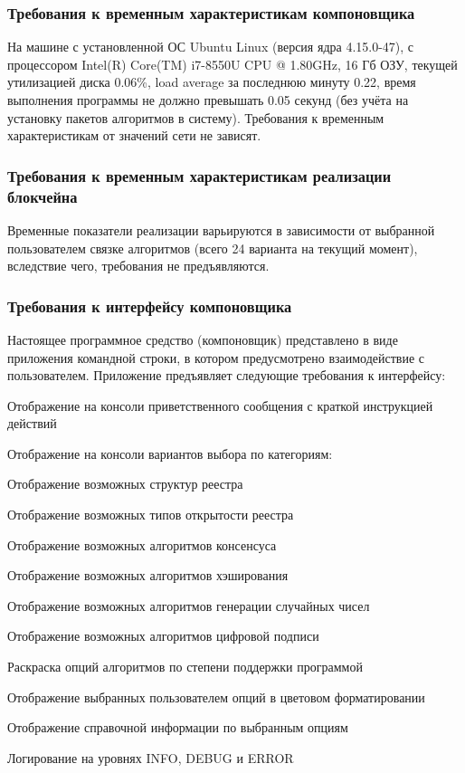 \subsubsection{Требования к временным характеристикам компоновщика}
На машине с установленной ОС Ubuntu Linux (версия ядра 4.15.0-47), с
процессором Intel(R) Core(TM) i7-8550U CPU @ 1.80GHz, 16 Гб ОЗУ, текущей
утилизацией диска 0.06\%, load average за последнюю минуту 0.22, время
выполнения программы не должно превышать 0.05 секунд (без учёта на установку
пакетов алгоритмов в систему). Требования к временным характеристикам от
значений сети не зависят.

\subsubsection{Требования к временным характеристикам реализации блокчейна}
Временные показатели реализации варьируются в зависимости от выбранной
пользователем связке алгоритмов (всего 24 варианта на текущий момент),
вследствие чего, требования не предъявляются.

\subsubsection{Требования к интерфейсу компоновщика}
Настоящее программное средство (компоновщик) представлено в виде приложения
командной строки, в котором предусмотрено взаимодействие с пользователем.
Приложение предъявляет следующие требования к интерфейсу:
\begin{my_enumerate}
    \item Отображение на консоли приветственного сообщения с краткой инструкцией действий
    \item Отображение на консоли вариантов выбора по категориям:
        \begin{my_enumerate}
                \item Отображение возможных структур реестра
                \item Отображение возможных типов открытости реестра
                \item Отображение возможных алгоритмов консенсуса
                \item Отображение возможных алгоритмов хэширования
                \item Отображение возможных алгоритмов генерации случайных чисел
                \item Отображение возможных алгоритмов цифровой подписи
        \end{my_enumerate}
    \item Раскраска опций алгоритмов по степени поддержки программой
    \item Отображение выбранных пользователем опций в цветовом форматировании
    \item Отображение справочной информации по выбранным опциям
    \item Логирование на уровнях INFO, DEBUG и ERROR
\end{my_enumerate}

